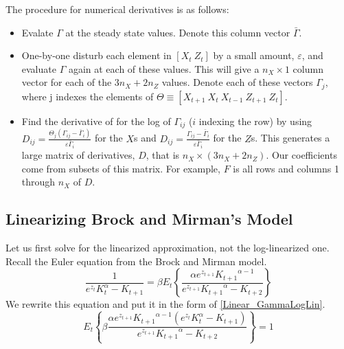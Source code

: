 \documentclass[letterpaper,12pt]{article}
\newcommand{\ve}{\varepsilon}
\theoremstyle{definition}
\begin{document}
\begin{spacing}{1.5}
		The procedure for numerical derivatives is as follows:
		\begin{itemize}
		\item Evalate $\Gamma$ at the steady state values. Denote this column vector $\bar \Gamma$.
		\item One-by-one disturb each element in $[X_t \>Z_t]$ by a small amount, $\ve$, and evaluate $\Gamma$ again at each of these values. This will give a $n_X \times 1$ column vector for each of the $3n_X + 2n_Z$ values. Denote each of these vectors $\Gamma_j$, where j indexes the elements of $\Theta \equiv [X_{t+1}\> X_t \>X_{t-1} \>Z_{t+1} \>Z_t]$.
		\item Find the derivative of for the log of $\Gamma_{ij}$ ($i$ indexing the row) by using $D_{ij} = \frac{\Theta_j (\Gamma_{ij}-\bar \Gamma_i)}{\ve \bar \Gamma_i}$ for the $X$s and $D_{ij} = \frac{\Gamma_{ij}-\bar \Gamma_i}{\ve \bar \Gamma_i}$ for the $Z$s. This generates a large matrix of derivatives, $D$, that is $n_X \times (3n_X +2n_Z)$. Our coefficients come from subsets of this matrix. For example, $F$ is all rows and columns 1 through $n_X$ of $D$.
		\end{itemize}

	\subsection{Linearizing Brock and Mirman's Model}\label{Linear_LinBM}
		Let us first solve for the linearized approximation, not the log-linearized one.
		Recall the Euler equation from the Brock and Mirman model.
		\begin{equation}\label{Linear_BMEulerLL}
		\frac{1}{e^{z_t}K_t^\alpha - K_{t+1}} = \beta E_t \left\{\frac{\alpha e^{z_{t+1}}{K_{t+1}}^{\alpha-1}}{e^{z_{t+1}}{K_{t+1}}^\alpha - K_{t+2}} \right\} \nonumber
		\end{equation}
		We rewrite this equation and put it in the form of \eqref{Linear_GammaLogLin}.
		\begin{equation}\label{Linear_BMGamma}
		E_t\left\{ \beta \frac{\alpha e^{z_{t+1}}{K_{t+1}}^{\alpha-1}(e^{z_t}K_t^\alpha - K_{t+1})} {e^{z_{t+1}}{K_{t+1}}^\alpha - K_{t+2}} \right\} = 1
		\end{equation}


\end{spacing}
\end{document}
